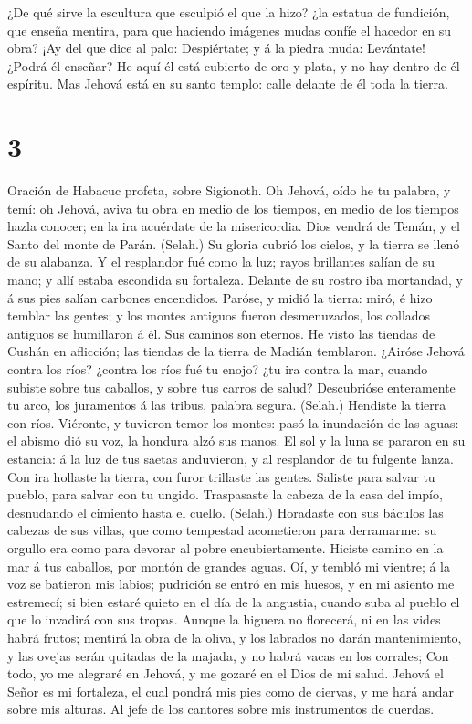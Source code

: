  ¿De qué sirve la escultura que esculpió el que la hizo?
¿la estatua de fundición, que enseña mentira, para que haciendo imágenes
mudas confíe el hacedor en su obra?  ¡Ay del que dice al
palo: Despiértate; y á la piedra muda: Levántate! ¿Podrá él enseñar? He
aquí él está cubierto de oro y plata, y no hay dentro de él espíritu.
 Mas Jehová está en su santo templo: calle delante de él
toda la tierra.

\hypertarget{section-2}{%
\section{3}\label{section-2}}

 Oración de Habacuc profeta, sobre Sigionoth. 
Oh Jehová, oído he tu palabra, y temí: oh Jehová, aviva tu obra en medio
de los tiempos, en medio de los tiempos hazla conocer; en la ira
acuérdate de la misericordia.  Dios vendrá de Temán, y el
Santo del monte de Parán. (Selah.) Su gloria cubrió los cielos, y la
tierra se llenó de su alabanza.  Y el resplandor fué como la
luz; rayos brillantes salían de su mano; y allí estaba escondida su
fortaleza.  Delante de su rostro iba mortandad, y á sus pies
salían carbones encendidos.  Paróse, y midió la tierra:
miró, é hizo temblar las gentes; y los montes antiguos fueron
desmenuzados, los collados antiguos se humillaron á él. Sus caminos son
eternos.  He visto las tiendas de Cushán en aflicción; las
tiendas de la tierra de Madián temblaron.  ¿Airóse Jehová
contra los ríos? ¿contra los ríos fué tu enojo? ¿tu ira contra la mar,
cuando subiste sobre tus caballos, y sobre tus carros de salud?
 Descubrióse enteramente tu arco, los juramentos á las
tribus, palabra segura. (Selah.) Hendiste la tierra con ríos.
 Viéronte, y tuvieron temor los montes: pasó la inundación
de las aguas: el abismo dió su voz, la hondura alzó sus manos.
 El sol y la luna se pararon en su estancia: á la luz de
tus saetas anduvieron, y al resplandor de tu fulgente lanza.
 Con ira hollaste la tierra, con furor trillaste las
gentes.  Saliste para salvar tu pueblo, para salvar con tu
ungido. Traspasaste la cabeza de la casa del impío, desnudando el
cimiento hasta el cuello. (Selah.)  Horadaste con sus
báculos las cabezas de sus villas, que como tempestad acometieron para
derramarme: su orgullo era como para devorar al pobre encubiertamente.
 Hiciste camino en la mar á tus caballos, por montón de
grandes aguas.  Oí, y tembló mi vientre; á la voz se
batieron mis labios; pudrición se entró en mis huesos, y en mi asiento
me estremecí; si bien estaré quieto en el día de la angustia, cuando
suba al pueblo el que lo invadirá con sus tropas.  Aunque
la higuera no florecerá, ni en las vides habrá frutos; mentirá la obra
de la oliva, y los labrados no darán mantenimiento, y las ovejas serán
quitadas de la majada, y no habrá vacas en los corrales; 
Con todo, yo me alegraré en Jehová, y me gozaré en el Dios de mi salud.
 Jehová el Señor es mi fortaleza, el cual pondrá mis pies
como de ciervas, y me hará andar sobre mis alturas. Al jefe de los
cantores sobre mis instrumentos de cuerdas.
